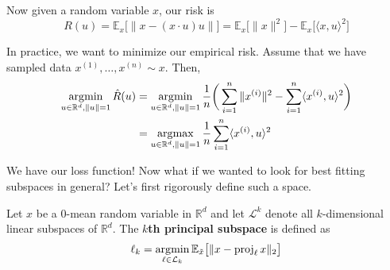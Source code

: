   Now given a random variable $x$, our risk is
  \begin{equation}
    R(u) = \mathbb{E}_x \big[ \| x - (x \cdot u) u \| \big] = \mathbb{E}_x \big[ \|x\|^2 \big] - \mathbb{E}_x \big[ \langle x, u \rangle^2 \big]
  \end{equation} 

  In practice, we want to minimize our empirical risk. Assume that we have sampled data $x^{(1)}, \ldots, x^{(n)} \sim x$. Then, 
  \begin{align} 
    \operatorname*{\arg\!\min}_{u \in \mathbb{R}^{d}, \|u\| = 1} \hat{R}(u) 
    & =  \operatorname*{\arg\!\min}_{u \in \mathbb{R}^{d}, \|u\| = 1} \frac{1}{n} \bigg( \sum_{i = 1}^n \|x^{(i)} \|^2 - \sum_{i=1}^n \langle x^{(i)}, u \rangle^2 \bigg) \\ 
    & = \operatorname*{\arg\!\max}_{u \in \mathbb{R}^{d}, \|u\| = 1} \frac{1}{n} \sum_{i=1}^n \langle x^{(i)}, u \rangle^2 
  \end{align} 

  We have our loss function! Now what if we wanted to look for best fitting subspaces in general? Let's first rigorously define such a space. 

  \begin{definition} 
    Let $x$ be a $0$-mean random variable in $\mathbb{R}^d$ and let $\mathcal{L}^k$ denote all $k$-dimensional linear subspaces of $\mathbb{R}^d$. The \textbf{$k$th principal subspace} is defined as 
    \begin{equation}
      \ell_k = \operatorname*{\arg\!\min}_{\ell \in \mathcal{L}_k} \mathbb{E}_{\Tilde{x}} \big[ \| x - \operatorname{proj}_\ell x\|_2 \big]
    \end{equation}
  \end{definition}


